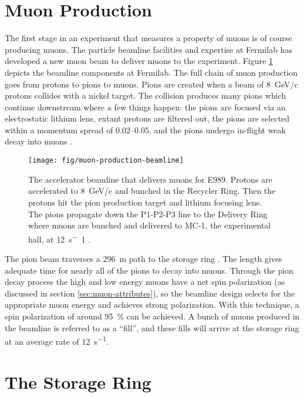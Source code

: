 \section{Muon Production} \label{sec:muon-production}

The first stage in an experiment that measures a property of muons is of course producing muons.  The particle beamline facilities and expertise at Fermilab has developed a new muon beam to deliver muons to the \gmtwo experiment.  Figure \ref{fig:muon-production-beamline} depicts the beamline components at Fermilab.  The full chain of muon production goes from protons to pions to muons.  Pions are created when a beam of \SI{8}{\GeV/c} protons collides with a nickel target.  The collision produces many pions which continue downstream where a few things happen: the pions are focused via an electrostatic lithium lens, extant protons are filtered out, the pions are selected within a momentum spread of \SIrange{0.02}{0.05}{}, and the pions undergo in-flight weak decay into muons \cite{e989-tdr}.

\begin{figure}
\label{fig:muon-production-beamline}
\texttt{[image: fig/muon-production-beamline]}
\caption{The accelerator beamline that delivers muons for E989.  Protons are accelerated to \SI{8}{\GeV/c} and bunched in the Recycler Ring.  Then the protons hit the pion production target and lithium focusing lens.  The pions propagate down the P1-P2-P3 line to the Delivery Ring where muons are bunched and delivered to MC-1, the \mugmtwo experimental hall, at \SI{12}{\second^-1} \cite{e989-tdr}. }
\end{figure}

The pion beam traverses a \SI{296}{\meter} path to the storage ring \cite{e989-tdr}.  The length gives adequate time for nearly all of the pions to decay into muons.  Through the pion decay process the high and low energy muons have a net spin polarization (as discussed in section \ref{sec:muon-attributes}), so the beamline design selects for the appropriate muon energy and achieves strong polarization. With this technique, a spin polarization of around \SI{95}{\percent} can be achieved.  A bunch of muons produced in the beamline is referred to as a ``fill'', and these fills will arrive at the storage ring at an average rate of \SI{12}{\second^{-1}}\cite{e989-tdr}.

\section{The Storage Ring} \label{sec:storage-ring}

